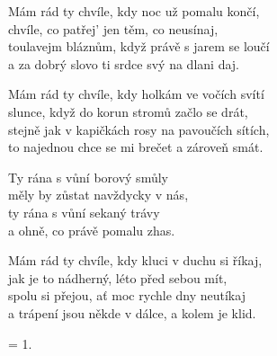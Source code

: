 
\ve{}
Mám rád ty chvíle, kdy noc už pomalu končí,\\
chvíle, co patřej' jen těm, co neusínaj,\\
toulavejm bláznům, když právě s jarem se loučí\\
a za dobrý slovo ti srdce svý na dlani daj. 

\ve{}
Mám rád ty chvíle, kdy holkám ve vočích svítí\\
slunce, když do korun stromů začlo se drát,\\
stejně jak v kapičkách rosy na pavoučích sítích,\\
to najednou chce se mi brečet a zároveň smát.

\cho{}
Ty rána s vůní borový smůly\\
měly by zůstat navždycky v nás,\\
ty rána s vůní sekaný trávy\\
a ohně, co právě pomalu zhas.

\ve{}
Mám rád ty chvíle, kdy kluci v duchu si říkaj,\\
jak je to nádherný, léto před sebou mít,\\
spolu si přejou, ať moc rychle dny neutíkaj\\
a trápení jsou někde v dálce, a kolem je klid.

\ve{}
= 1.

\cho{}

\esong


